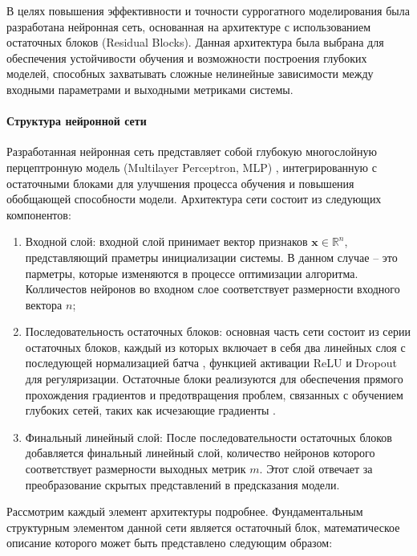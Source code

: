 В целях повышения эффективности и точности суррогатного моделирования была разработана нейронная сеть,
основанная на архитектуре с использованием остаточных блоков (Residual Blocks). Данная архитектура была
выбрана для обеспечения устойчивости обучения и возможности построения глубоких моделей, способных захватывать
сложные нелинейные зависимости между входными параметрами и выходными метриками системы.

\paragraph{Структура нейронной сети}\label{sec:ch4/sec4/subsec1/subsubsec1}

Разработанная нейронная сеть представляет собой глубокую многослойную перцептронную модель (Multilayer Perceptron, MLP) \cite*{goodfellow2016deep},
интегрированную с остаточными блоками для улучшения процесса обучения и повышения обобщающей способности модели.
Архитектура сети состоит из следующих компонентов:

\begin{enumerate}
    \item Входной слой: входной слой принимает вектор признаков $\mathbf{x} \in \mathbb{R}^n$,
          представляющий праметры инициализации системы. В данном случае -- это парметры,
          которые изменяются в процессе оптимизации алгоритма. Колличестов нейронов во входном
          слое соответствует размерности входного вектора $n$;

    \item Последовательность остаточных блоков: основная часть сети состоит из серии остаточных блоков,
          каждый из которых включает в себя два линейных слоя с последующей нормализацией батча \cite*{ioffe2015batch},
          функцией активации ReLU и Dropout для регуляризации. Остаточные блоки
          реализуются для обеспечения прямого прохождения градиентов и предотвращения
          проблем, связанных с обучением глубоких сетей, таких как исчезающие градиенты \cite*{he2016deep}.

    \item Финальный линейный слой: После последовательности остаточных блоков добавляется финальный линейный слой,
          количество нейронов которого соответствует размерности выходных метрик $m$.
          Этот слой отвечает за преобразование скрытых представлений в предсказания модели.
\end{enumerate}

Рассмотрим каждый элемент архитектуры подробнее.
Фундаментальным структурным элементом данной сети является остаточный блок,
математическое описание которого может быть представлено следующим образом:

